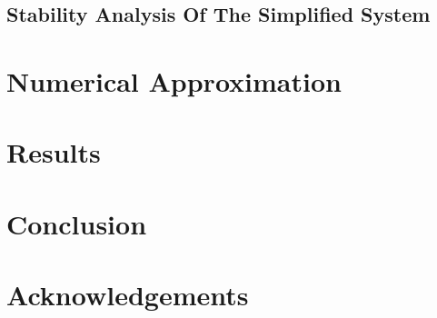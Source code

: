 \documentclass[12pt]{article}
\begin{document}
\subsection{Stability Analysis Of The Simplified System}



\section{Numerical Approximation}

\section{Results}

\section{Conclusion}

\section{Acknowledgements}
\end{document}
